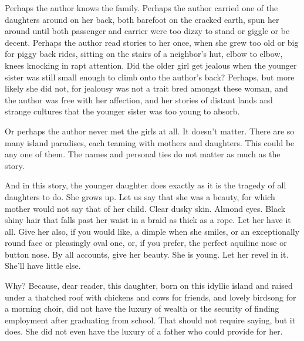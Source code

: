 \documentclass{amsart}
\begin{document}
Perhaps the author knows the family. Perhaps the author carried one of the daughters around on her back, both barefoot on the cracked earth, spun her around until both passenger and carrier were too dizzy to stand or giggle or be decent. Perhaps the author read stories to her once, when she grew too old or big for piggy back rides, sitting on the stairs of a neighbor's hut, elbow to elbow, knees knocking in rapt attention. Did the older girl get jealous when the younger sister was still small enough to climb onto the author's back? Perhaps, but more likely she did not, for jealousy was not a trait bred amongst these woman, and the author was free with her affection, and her stories of distant lands and strange cultures that the younger sister was too young to absorb.

Or perhaps the author never met the girls at all. It doesn't matter. There are so many island paradises, each teaming with mothers and daughters. This could be any one of them. The names and personal ties do not matter as much as the story.

And in this story, the younger daughter does exactly as it is the tragedy of all daughters to do. She grows up. Let us say that she was a beauty, for which mother would not say that of her child. Clear dusky skin. Almond eyes. Black shiny hair that falls past her waist in a braid as thick as a rope. Let her have it all. Give her also, if you would like, a dimple when she smiles, or an exceptionally round face or pleasingly oval one, or, if you prefer, the perfect aquiline nose or button nose. By all accounts, give her beauty. She is young. Let her revel in it. She'll have little else.

Why? Because, dear reader, this daughter, born on this idyllic island and raised under a thatched roof with chickens and cows for friends, and lovely birdsong for a morning choir, did not have the luxury of wealth or the security of finding employment after graduating from school. That should not require saying, but it does. She did not even have the luxury of a father who could provide for her. 
\end{document}
